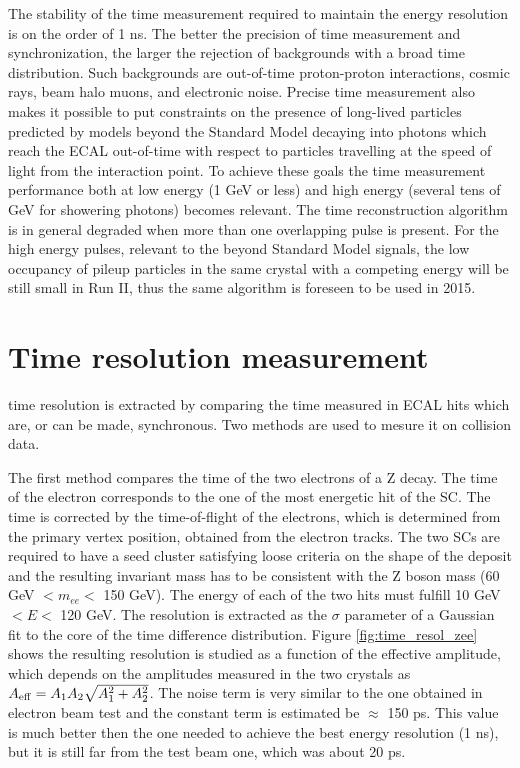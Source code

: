 \documentclass[journal]{IEEEtran}
\begin{document}
The stability of the time measurement required to maintain the energy resolution is on the order of 1 ns. The better the precision of time measurement and synchronization, the larger the rejection of backgrounds with a broad time distribution. Such backgrounds are out-of-time proton-proton interactions, cosmic rays, beam halo muons, and electronic noise. Precise time measurement also makes it possible to put constraints on the presence of long-lived particles predicted by models beyond the Standard Model decaying into photons which reach the ECAL  out-of-time with respect to particles travelling at the speed of light from the interaction point. To achieve these goals the time measurement performance both at low energy (1 GeV or less) and high energy (several tens of GeV for showering photons) becomes relevant.
The time reconstruction algorithm is in general degraded when more than one overlapping pulse is present.  For the high energy pulses, relevant to the beyond Standard Model signals, the low occupancy of pileup particles in the same crystal with a competing energy will be still small in Run II, thus the same algorithm is foreseen to be used in 2015.


\section{Time resolution measurement}
\label{sec:timeresolution}
 time resolution is extracted by comparing the time measured in ECAL hits which are, or can be made, synchronous. Two methods are used to mesure it on collision data.

The first method compares the time of the two electrons of a Z decay. The time of the electron corresponds to the one of the most energetic hit of the SC. The time is corrected by the time-of-flight of the electrons, which is determined from the primary vertex position, obtained from the electron tracks. The two SCs are required to have a seed cluster satisfying loose criteria on the shape of the deposit and the resulting invariant mass has to be consistent with the Z boson mass (60 GeV $<m_{ee}<$ 150 GeV). The energy of each of the two hits must fulfill 10 GeV $<E<$ 120 GeV. The resolution is extracted as the $\sigma$ parameter of a Gaussian fit to the core of the time difference distribution. Figure \ref{fig:time_resol_zee} shows the resulting resolution is studied as a function of the effective amplitude, which depends on the amplitudes measured in the two crystals as $A_{\rm eff} = A_1 A_2 \sqrt{A_1^2 + A_2^2}$. The noise term is very similar to the one obtained in electron beam test and the constant term is estimated be $\approx$ 150 ps. This value is much better then the one needed to achieve the best energy resolution (1 ns), but it is still far from the test beam one, which was about 20 ps.
\end{document}
